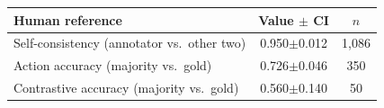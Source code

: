 \setlength{\tabcolsep}{3pt}
\begin{tabular}{lcc}
\toprule
Human reference & Value $\pm$ CI & $n$ \\
\midrule
Self-consistency (annotator vs.\ other two) & 0.950$\pm$0.012 & 1{,}086 \\
Action accuracy (majority vs.\ gold) & 0.726$\pm$0.046 & 350 \\
Contrastive accuracy (majority vs.\ gold) & 0.560$\pm$0.140 & 50 \\
\bottomrule
\end{tabular}
